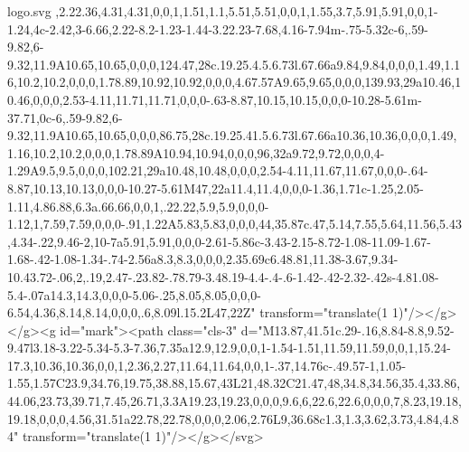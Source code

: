 \begin{filecontents*}[overwrite]{logo.svg}
,2.22.36,4.31,4.31,0,0,1,1.51,1.1,5.51,5.51,0,0,1,1.55,3.7,5.91,5.91,0,0,1-1.24,4c-2.42,3-6.66,2.22-8.2-1.23-1.44-3.22.23-7.68,4.16-7.94m-.75-5.32c-6,.59-9.82,6-9.32,11.9A10.65,10.65,0,0,0,124.47,28c.19.25.4.5.6.73l.67.66a9.84,9.84,0,0,0,1.49,1.16,10.2,10.2,0,0,0,1.78.89,10.92,10.92,0,0,0,4.67.57A9.65,9.65,0,0,0,139.93,29a10.46,10.46,0,0,0,2.53-4.11,11.71,11.71,0,0,0-.63-8.87,10.15,10.15,0,0,0-10.28-5.61m-37.71,0c-6,.59-9.82,6-9.32,11.9A10.65,10.65,0,0,0,86.75,28c.19.25.41.5.6.73l.67.66a10.36,10.36,0,0,0,1.49,1.16,10.2,10.2,0,0,0,1.78.89A10.94,10.94,0,0,0,96,32a9.72,9.72,0,0,0,4-1.29A9.5,9.5,0,0,0,102.21,29a10.48,10.48,0,0,0,2.54-4.11,11.67,11.67,0,0,0-.64-8.87,10.13,10.13,0,0,0-10.27-5.61M47,22a11.4,11.4,0,0,0-1.36,1.71c-1.25,2.05-1.11,4.86.88,6.3a.66.66,0,0,1,.22.22,5.9,5.9,0,0,0-1.12,1,7.59,7.59,0,0,0-.91,1.22A5.83,5.83,0,0,0,44,35.87c.47,5.14,7.55,5.64,11.56,5.43,4.34-.22,9.46-2,10-7a5.91,5.91,0,0,0-2.61-5.86c-3.43-2.15-8.72-1.08-11.09-1.67-1.68-.42-1.08-1.34-.74-2.56a8.3,8.3,0,0,0,2.35.69c6.48.81,11.38-3.67,9.34-10.43.72-.06,2,.19,2.47-.23.82-.78.79-3.48.19-4.4-.4-.6-1.42-.42-2.32-.42s-4.81.08-5.4-.07a14.3,14.3,0,0,0-5.06-.25,8.05,8.05,0,0,0-6.54,4.36,8.14,8.14,0,0,0,.6,8.09l.15.2L47,22Z" transform="translate(1 1)"/></g></g><g id="mark"><path class="cls-3" d="M13.87,41.51c.29-.16,8.84-8.8,9.52-9.47l3.18-3.22-5.34-5.3-7.36,7.35a12.9,12.9,0,0,1-1.54-1.51,11.59,11.59,0,0,1,15.24-17.3,10.36,10.36,0,0,1,2.36,2.27,11.64,11.64,0,0,1-.37,14.76c-.49.57-1,1.05-1.55,1.57C23.9,34.76,19.75,38.88,15.67,43L21,48.32C21.47,48,34.8,34.56,35.4,33.86,44.06,23.73,39.71,7.45,26.71,3.3A19.23,19.23,0,0,0,9.6,6,22.6,22.6,0,0,0,7,8.23,19.18,19.18,0,0,0,4.56,31.51a22.78,22.78,0,0,0,2.06,2.76L9,36.68c1.3,1.3,3.62,3.73,4.84,4.84" transform="translate(1 1)"/></g></svg>
	\end{filecontents*}
\fi

\newcommand{\cardicon}{	
	
}
